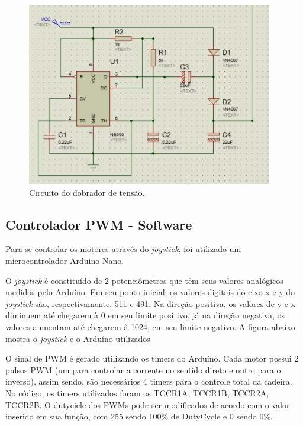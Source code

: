 \begin{figure}[h!]
  \centering
  \includegraphics[scale=0.9]{figuras/Dobrador.jpg}
  \caption{Circuito do dobrador de tensão.}
\end{figure}

\subsection{Controlador PWM - Software}

Para se controlar os motores através do \textit{joystick}, foi utilizado um
microcontrolador Arduino Nano. 

O \textit{joystick} é constituído de 2 potenciômetros que têm seus valores
analógicos medidos pelo Arduíno. Em seu ponto inicial, os valores digitais do eixo x e y
do \textit{joystick} são, respectivamente, 511 e 491. Na direção positiva, os valores de
y e x diminuem até chegarem à 0 em seu limite positivo, já na direção negativa,
os valores aumentam até chegarem à 1024, em seu limite negativo. A figura
abaixo mostra o \textit{joystick} e o Arduíno utilizados

O sinal de PWM é gerado utilizando os timers do Arduíno. Cada motor possui 2 pulsos PWM (um para controlar a corrente no sentido direto e outro para o inverso), assim sendo, são necessários 4 timers para o controle total da cadeira. No código, os timers utilizados foram os TCCR1A, TCCR1B, TCCR2A, TCCR2B. O dutycicle dos PWMs pode ser modificados de acordo com o valor inserido em sua função, com 255 sendo 100\% de DutyCycle e 0 sendo 0\%.

